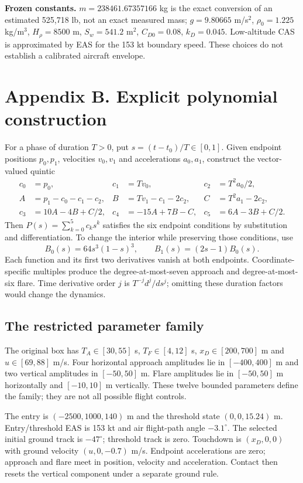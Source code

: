 \textbf{Frozen constants.} $m=238461.67357166$ kg is the exact conversion of an estimated 525,718 lb, not an exact measured mass; $g=9.80665$ m/s$^2$, $\rho_0=1.225$ kg/m$^3$, $H_\rho=8500$ m, $S_w=541.2$ m$^2$, $C_{D0}=0.08$, $k_D=0.045$. Low-altitude CAS is approximated by EAS for the 153 kt boundary speed. These choices do not establish a calibrated aircraft envelope.
\clearpage
\section{Appendix B. Explicit polynomial construction}\label{app:polynomial}
For a phase of duration $T>0$, put $s=(t-t_0)/T\in[0,1]$. Given endpoint positions $p_0,p_1$, velocities $v_0,v_1$ and accelerations $a_0,a_1$, construct the vector-valued quintic
\begin{align}
c_0&=p_0,&c_1&=Tv_0,&c_2&=T^2a_0/2,\\
A&=p_1-c_0-c_1-c_2,&B&=Tv_1-c_1-2c_2,&C&=T^2a_1-2c_2,\\
c_3&=10A-4B+C/2,&c_4&=-15A+7B-C,&c_5&=6A-3B+C/2.
\end{align}
Then $P(s)=\sum_{k=0}^{5}c_ks^k$ satisfies the six endpoint conditions by substitution and differentiation. To change the interior while preserving those conditions, use
\[
B_0(s)=64s^3(1-s)^3,\qquad B_1(s)=(2s-1)B_0(s).
\]
Each function and its first two derivatives vanish at both endpoints. Coordinate-specific multiples produce the degree-at-most-seven approach and degree-at-most-six flare. Time derivative order $j$ is $T^{-j}d^j/ds^j$; omitting these duration factors would change the dynamics.

\subsection*{The restricted parameter family}
The original box has $T_A\in[30,55]$ s, $T_F\in[4,12]$ s, $x_D\in[200,700]$ m and $u\in[69,88]$ m/s. Four horizontal approach amplitudes lie in $[-400,400]$ m and two vertical amplitudes in $[-50,50]$ m. Flare amplitudes lie in $[-50,50]$ m horizontally and $[-10,10]$ m vertically. These twelve bounded parameters define the family; they are not all possible flight controls.

The entry is $(-2500,1000,140)$ m and the threshold state $(0,0,15.24)$ m. Entry/threshold EAS is 153 kt and air flight-path angle $-3.1^\circ$. The selected initial ground track is $-47^\circ$; threshold track is zero. Touchdown is $(x_D,0,0)$ with ground velocity $(u,0,-0.7)$ m/s. Endpoint accelerations are zero; approach and flare meet in position, velocity and acceleration. Contact then resets the vertical component under a separate ground rule.

